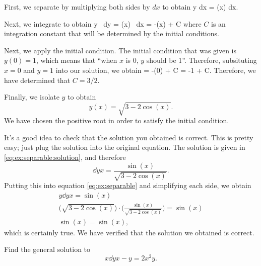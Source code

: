 \documentclass{book}
\begin{document}
\begin{solution}

  First, we separate by multiplying both sides by $dx$ to obtain
  \be
    y \;dx = \sin(x) \;dx.
  \ee


  Next, we integrate to obtain
  \be
    \int y \, dy = \int \sin(x) \, dx
    \quad {} \quad
     = -\cos(x) + C
  \ee
  where $C$ is an integration constant that will be determined by the
  initial conditions.


  Next, we apply the initial condition.  The initial condition that
  was given is $y(0) = 1$, which means that ``when $x$ is 0, $y$
  should be 1''.  Therefore, subsituting $x=0$ and $y=1$ into our
  solution, we obtain
  \be
     = -\cos(0) + C
    \quad {} \quad
     = -1 + C.
  \ee
  Therefore, we have determined that $C = 3/2$.


  Finally, we isolate $y$ to obtain
  \begin{equation} \label{eq:ex:separable:solution}
    y(x) = \sqrt{3 - 2\cos(x)}.
  \end{equation}
  We have chosen the positive root in order to satisfy the initial
  condition.


  It's a good idea to check that the solution you obtained is correct.
  This is pretty easy; just plug the solution into the original
  equation.  The solution is given in
  \eqref{eq:ex:separable:solution}, and therefore
  \begin{equation*}
    \dd{y}{x} = \frac{\sin(x)}{\sqrt{3 -2 \cos(x)}}.
  \end{equation*}
  Putting this into equation \eqref{eq:ex:separable} and simplifying
  each side, we obtain
  \begin{gather*}
    y \dd{y}{x} = \sin(x) \\
    \bigl(\sqrt{3 - 2\cos(x)}\bigr) \cdot
    \biggl(\frac{\sin(x)}{\sqrt{3 -2 \cos(x)}}\biggr) = \sin(x) \\
    \sin(x) = \sin(x),
  \end{gather*}
  which is certainly true.  We have verified that the solution we
  obtained is correct.
\end{solution}

\begin{example}
  Find the general solution to
  \begin{equation*}
    x \dd{y}{x} - y = 2 x^2 y.
  \end{equation*}
\end{example}
\end{document}
